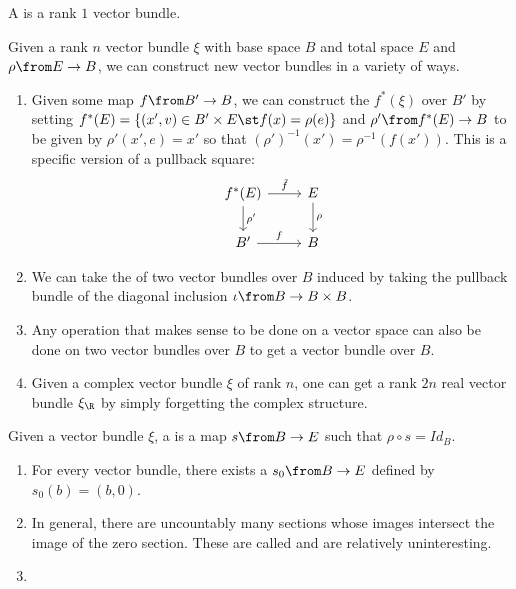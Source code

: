 \documentclass[11pt,leqno,oneside]{amsbook}
\numberwithin{thm}{section}
\begin{document}
\begin{defn}
  A  is a rank \(1\) vector bundle.
\end{defn}
\begin{prop}\label{new-bundles-from-old}
  Given a rank \(n\) vector bundle \(\xi\) with base space \(B\) and
  total space 
  \(E\) and \(\rho \from E \to B\), we can construct new vector
  bundles  
  in a variety of ways.
  \begin{enumerate}
  \item Given some map \(f \from B' \to B\), we can construct the
     \(f^*(\xi)\) over \(B'\) by setting \(f^*(E)
    = \{(x',v) \in B' \times E \st f(x) = \rho(e)\}\) and \(\rho'
    \from f^*(E) \to B\) to be given by \(\rho'(x',e) = x'\) so that
    \((\rho')^{-1}(x') = \rho^{-1}(f(x'))\). This is a
    specific version of a pullback square: 
    \[
      \begin{tikzcd}
        f^*(E) \ar[d,"\rho'"] \ar[r,"\tilde{f}"] & E \ar[d,"\rho"]\\
        B' \ar[r, "f"] & B
      \end{tikzcd}
    \]

  \item We can take the  of two vector bundles over
    \(B\) induced by taking the pullback bundle of the diagonal
    inclusion \(\iota \from B \to B \times B\). 
  \item Any operation that makes sense to be done on a vector space
    can also be done on two vector bundles over \(B\) to get a vector
    bundle over \(B\).
  \item Given a complex vector bundle \(\xi\) of rank \(n\), one can
    get a rank \(2n\) 
    real vector bundle \(\xi_\R\) by simply forgetting the complex
    structure. 
  \end{enumerate}
\end{prop}
\begin{defn}
  Given a vector bundle \(\xi\), a  is a map \(s \from B
  \to E\) such that \(\rho \circ s = Id_B\).
\end{defn}
\begin{example}
  \begin{enumerate}
  \item For every vector bundle, there exists a 
    \(s_0 \from B \to E\) defined by \(s_0(b) = (b,0)\).
  \item In general, there are uncountably many sections whose images
    intersect 
    the image of the zero section. These are called  and are relatively uninteresting.
  \item {}
  \end{enumerate}
\end{example}
\end{document}
